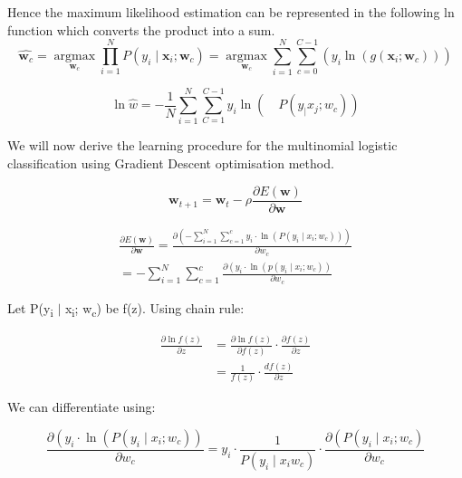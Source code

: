 \documentclass{article}
\begin{document}
Hence the maximum likelihood estimation can be represented in the following ln function which converts the product into a sum.
\begin{equation}
    \hat{\boldsymbol{w}_c}=\underset{\boldsymbol{w}_c}{\operatorname{argmax}} \prod_{i=1}^N P\left(y_i \mid \boldsymbol{x}_i ; \boldsymbol{w}_c\right)=\underset{\boldsymbol{w}_c}{\operatorname{argmax}} \sum_{i=1}^N \sum_{c=0}^{C-1}\left(y_i \ln \left(g\left(\boldsymbol{x}_i ; \boldsymbol{w}_c\right)\right)\right)
\end{equation}

\begin{equation}
    \ln \hat{w} =-\frac{1}{N} \sum_{i=1}^{N} \sum_{C=1}^{C-1} y_i\ln \left(\quad P(y_ \mid x_{j};w_{c})\right)
\end{equation}

We will now derive the learning procedure for the multinomial logistic classification using Gradient Descent optimisation method.

\begin{equation}
    \boldsymbol{w}_{t+1}=\boldsymbol{w}_t-\rho \frac{\partial E(\boldsymbol{w})}{\partial \boldsymbol{w}}
\end{equation}


$$
\begin{aligned}
    \frac{\partial E(\boldsymbol{w})}{\partial \boldsymbol{w}}=\frac{\partial\left(-\sum_{i=1}^N \sum_{c=1}^c y_i \cdot \ln \left(P\left(y_i \mid x_i ; w_c\right)\right)\right)}{\partial w_c} \\
    = -\sum_{i=1}^N \sum_{c=1}^c \frac{\partial\left(y_i \cdot \ln \left(p\left(y_i \mid x_i ; w_c\right)\right)\right.}{\partial w_c}
\end{aligned}
$$

Let P(y\textsubscript{i} $\mid$ x\textsubscript{i}; w\textsubscript{c}) be f(z). Using chain rule:

\begin{equation}
    \begin{aligned}
        \frac{\partial \ln f(z)}{\partial z} & =\frac{\partial \ln f(z)}{\partial f(z)} \cdot \frac{\partial f(z)}{\partial z} \\
        & =\frac{1}{f(z)} \cdot \frac{d f(z)}{\partial z}
    \end{aligned}
\end{equation}

We can differentiate using: 

\begin{equation}
    \frac{\partial\left(y_i \cdot \ln \left(P\left(y_i \mid x_i ; w_c\right)\right)\right.}{\partial w_c}=y_i \cdot \frac{1}{P\left(y_i \mid x_{i} w_c\right)} \cdot \frac{\partial\left(P\left(y_i \mid x_i ; w_c\right)\right.}{\partial w_c}
\end{equation}
\linebreak
\end{document}
